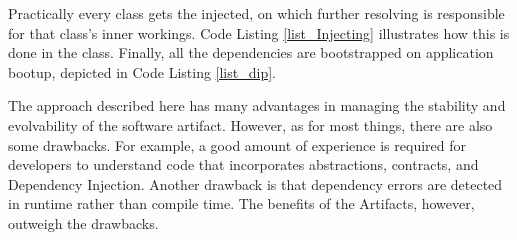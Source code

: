 Practically every class gets the 
injected, on which further resolving is responsible for that class's inner workings. Code
Listing \ref{list_Injecting} illustrates how this is done in the
 class. Finally, all the dependencies are
bootstrapped on application bootup, depicted in Code Listing \ref{list_dip}. 

The approach described here has many advantages in managing the stability and evolvability
of the software artifact. However, as for most things, there are also some drawbacks. For
example, a good amount of experience is required for developers to understand code that
incorporates abstractions, contracts, and Dependency Injection. Another drawback is that
dependency errors are detected in runtime rather than compile time. The benefits of the
Artifacts, however, outweigh the drawbacks.